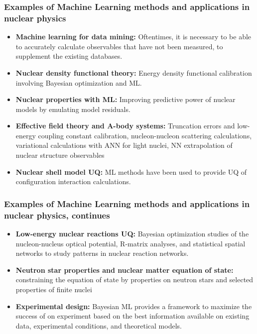 \documentclass{beamer}
\begin{document}
\begin{frame}
\frametitle{Examples of Machine Learning methods and applications in nuclear physics}

\begin{block}{}
\begin{itemize}
\item \textbf{Machine  learning  for  data  mining:} Oftentimes,  it  is necessary to be able to accurately calculate observables that have not been measured, to supplement the existing databases.

\item \textbf{Nuclear  density  functional   theory:} Energy density functional calibration   involving Bayesian optimization  and ML.

\item \textbf{Nuclear properties with ML:} Improving predictive power of nuclear models by emulating model residuals.

\item \textbf{Effective field theory and A-body systems:} Truncation errors and low-energy coupling constant calibration, nucleon-nucleon scattering calculations, variational calculations with ANN for light nuclei, NN extrapolation of nuclear structure observables

\item \textbf{Nuclear  shell  model  UQ:} ML methods  have  been  used  to  provide  UQ  of  configuration  interaction  calculations.
\end{itemize}

\noindent
\end{block}
\end{frame}

\begin{frame}
\frametitle{Examples of Machine Learning methods and applications in nuclear physics, continues}

\begin{block}{}
\begin{itemize}
\item \textbf{Low-energy nuclear reactions UQ:} Bayesian optimization studies of the nucleon-nucleus optical potential, R-matrix analyses,  and  statistical spatial networks to study patterns in nuclear reaction networks.

\item \textbf{Neutron star properties and nuclear matter equation of state:} constraining the equation of state by properties on neutron stars and selected properties of finite nuclei

\item \textbf{Experimental design:} Bayesian ML provides a framework  to  maximize  the  success  of  on  experiment  based on  the  best  information  available  on existing  data, experimental conditions, and theoretical models.
\end{itemize}

\noindent
\end{block}
\end{frame}
\end{document}
